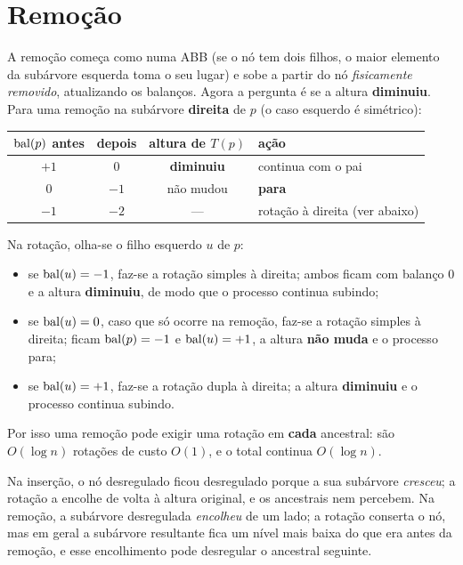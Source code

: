 \section{Remoção}\label{sec:avlrem}
A remoção começa como numa ABB (se o nó tem dois filhos, o maior elemento da subárvore esquerda toma o seu lugar) e sobe a partir do nó \emph{fisicamente removido}, atualizando os balanços. Agora a pergunta é se a altura \textbf{diminuiu}. Para uma remoção na subárvore \textbf{direita} de $p$ (o caso esquerdo é simétrico):
\begin{center}
\small
\begin{tabular}{@{}cccl@{}}
\toprule
$\operatorname{bal}(p)$ antes & depois & altura de $T(p)$ & ação\\
\midrule
$+1$ & $0$ & \textbf{diminuiu} & continua com o pai\\
$0$ & $-1$ & não mudou & \textbf{para}\\
$-1$ & $-2$ & --- & rotação à direita (ver abaixo)\\
\bottomrule
\end{tabular}
\end{center}
Na rotação, olha-se o filho esquerdo $u$ de $p$:
\begin{itemize}
  \item se $\operatorname{bal}(u)=-1$, faz-se a rotação simples à direita; ambos ficam com balanço 0 e a altura \textbf{diminuiu}, de modo que o processo continua subindo;
  \item se $\operatorname{bal}(u)=0$, caso que só ocorre na remoção, faz-se a rotação simples à direita; ficam $\operatorname{bal}(p)=-1$ e $\operatorname{bal}(u)=+1$, a altura \textbf{não muda} e o processo para;
  \item se $\operatorname{bal}(u)=+1$, faz-se a rotação dupla à direita; a altura \textbf{diminuiu} e o processo continua subindo.
\end{itemize}
Por isso uma remoção pode exigir uma rotação em \textbf{cada} ancestral: são $O(\log n)$ rotações de custo $O(1)$, e o total continua $O(\log n)$.

\begin{intuicao}
Na inserção, o nó desregulado ficou desregulado porque a sua subárvore \emph{cresceu}; a rotação a encolhe de volta à altura original, e os ancestrais nem percebem. Na remoção, a subárvore desregulada \emph{encolheu} de um lado; a rotação conserta o nó, mas em geral a subárvore resultante fica um nível mais baixa do que era antes da remoção, e esse encolhimento pode desregular o ancestral seguinte.
\end{intuicao}

